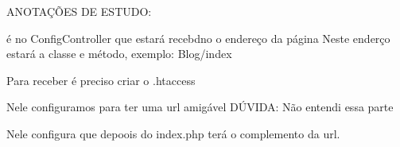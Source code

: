 ANOTAÇÕES DE ESTUDO:

é no ConfigController que estará recebdno o endereço da página
Neste enderço estará a classe e método, exemplo:
Blog/index

Para receber é preciso criar o .htaccess

Nele configuramos para ter uma url amigável
DÚVIDA: Não entendi essa parte

Nele configura que depoois do index.php terá o complemento da url.